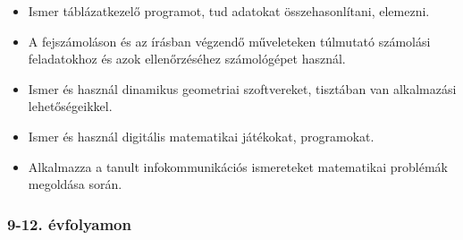 \begin{itemize}
\item
  Ismer táblázatkezelő programot, tud adatokat összehasonlítani,
  elemezni.
\item
  A fejszámoláson és az írásban végzendő műveleteken túlmutató számolási
  feladatokhoz és azok ellenőrzéséhez számológépet használ.
\item
  Ismer és használ dinamikus geometriai szoftvereket, tisztában van
  alkalmazási lehetőségeikkel.
\item
  Ismer és használ digitális matematikai játékokat, programokat.
\item
  Alkalmazza a tanult infokommunikációs ismereteket matematikai
  problémák megoldása során.
\end{itemize}

\hypertarget{evfolyamon-26}{%
\subsubsection{9-12. évfolyamon}\label{evfolyamon-26}}

